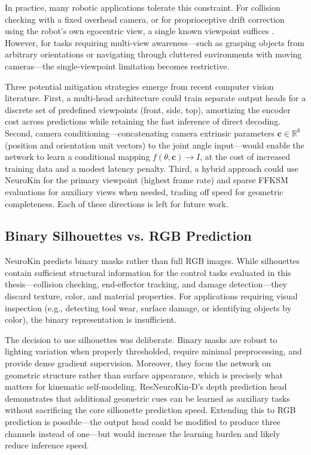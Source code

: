 \documentclass[12pt,a4paper,oneside]{report}
\begin{document}
In practice, many robotic applications tolerate this constraint. For collision checking with a fixed overhead camera, or for proprioceptive drift correction using the robot's own egocentric view, a single known viewpoint suffices \cite{chen2022full, hu2024teaching}. However, for tasks requiring multi-view awareness---such as grasping objects from arbitrary orientations or navigating through cluttered environments with moving cameras---the single-viewpoint limitation becomes restrictive.

Three potential mitigation strategies emerge from recent computer vision literature. First, a multi-head architecture could train separate output heads for a discrete set of predefined viewpoints (front, side, top), amortizing the encoder cost across predictions while retaining the fast inference of direct decoding. Second, camera conditioning---concatenating camera extrinsic parameters $\mathbf{c} \in \mathbb{R}^6$ (position and orientation unit vectors) to the joint angle input---would enable the network to learn a conditional mapping $f(\theta, \mathbf{c}) \rightarrow I$, at the cost of increased training data and a modest latency penalty. Third, a hybrid approach could use NeuroKin for the primary viewpoint (highest frame rate) and sparse FFKSM evaluations for auxiliary views when needed, trading off speed for geometric completeness. Each of these directions is left for future work.

\subsection{Binary Silhouettes vs. RGB Prediction}
NeuroKin predicts binary masks rather than full RGB images. While silhouettes contain sufficient structural information for the control tasks evaluated in this thesis---collision checking, end-effector tracking, and damage detection---they discard texture, color, and material properties. For applications requiring visual inspection (e.g., detecting tool wear, surface damage, or identifying objects by color), the binary representation is insufficient.

The decision to use silhouettes was deliberate. Binary masks are robust to lighting variation when properly thresholded, require minimal preprocessing, and provide dense gradient supervision. Moreover, they focus the network on geometric structure rather than surface appearance, which is precisely what matters for kinematic self-modeling. ResNeuroKin-D's depth prediction head demonstrates that additional geometric cues can be learned as auxiliary tasks without sacrificing the core silhouette prediction speed. Extending this to RGB prediction is possible---the output head could be modified to produce three channels instead of one---but would increase the learning burden and likely reduce inference speed.
\end{document}
